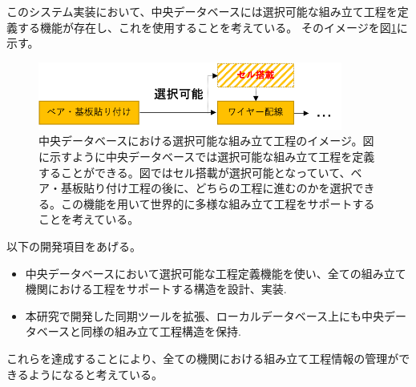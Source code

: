 このシステム実装において、中央データベースには選択可能な組み立て工程を定義する機能が存在し、これを使用することを考えている。
そのイメージを図\ref{optional_stage}に示す。

\begin{figure}[bpt]\centering
\includegraphics[width=10cm]{./optional_stage.png}
\caption[中央データベースにおける選択可能な組み立て工程のイメージ]{中央データベースにおける選択可能な組み立て工程のイメージ。図に示すように中央データベースでは選択可能な組み立て工程を定義することができる。図ではセル搭載が選択可能となっていて、ベア・基板貼り付け工程の後に、どちらの工程に進むのかを選択できる。この機能を用いて世界的に多様な組み立て工程をサポートすることを考えている。}
\label{optional_stage}
\end{figure}

以下の開発項目をあげる。
\begin{itemize}
  \item 中央データベースにおいて選択可能な工程定義機能を使い、全ての組み立て機関における工程をサポートする構造を設計、実装.
  \item 本研究で開発した同期ツールを拡張、ローカルデータベース上にも中央データベースと同様の組み立て工程構造を保持.
\end{itemize}

これらを達成することにより、全ての機関における組み立て工程情報の管理ができるようになると考えている。


